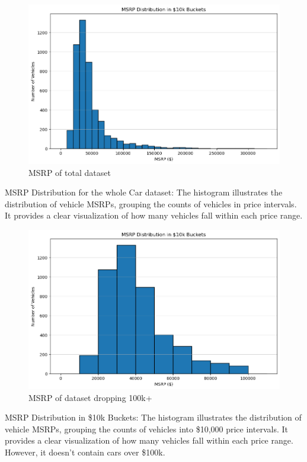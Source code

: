 \documentclass{article}
\begin{document}
\begin{figure}[h]
\caption{MSRP of total dataset}
\includegraphics[scale=0.5]{MSRP 10k less.png}\newline
\end{figure}
MSRP Distribution for the whole Car dataset: The histogram illustrates the distribution of vehicle MSRPs, grouping the counts of vehicles in price intervals. It provides a clear visualization of how many vehicles fall within each price range.

\begin{figure}[h]
\caption{MSRP of dataset dropping 100k+}
\includegraphics[scale=0.5]{MSRP in 10k.png}\newline
\end{figure}
MSRP Distribution in \$10k Buckets: The histogram illustrates the distribution of vehicle MSRPs, grouping the counts of vehicles into \$10,000 price intervals. It provides a clear visualization of how many vehicles fall within each price range. However, it doesn't contain cars over \$100k.
\end{document}
